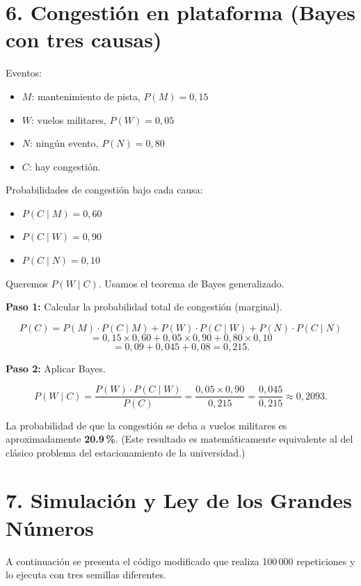 \documentclass[11pt,letterpaper]{article}
\begin{document}
\section*{6. Congestión en plataforma (Bayes con tres causas)}

Eventos:
\begin{itemize}
    \item $M$: mantenimiento de pista, $P(M) = 0{,}15$
    \item $W$: vuelos militares, $P(W) = 0{,}05$
    \item $N$: ningún evento, $P(N) = 0{,}80$
    \item $C$: hay congestión.
\end{itemize}

Probabilidades de congestión bajo cada causa:
\begin{itemize}
    \item $P(C \mid M) = 0{,}60$
    \item $P(C \mid W) = 0{,}90$
    \item $P(C \mid N) = 0{,}10$
\end{itemize}

Queremos $P(W \mid C)$. Usamos el teorema de Bayes generalizado.

\textbf{Paso 1:} Calcular la probabilidad total de congestión (marginal).

\[
P(C) = P(M) \cdot P(C \mid M) + P(W) \cdot P(C \mid W) + P(N) \cdot P(C \mid N)
\]
\[
= 0{,}15 \times 0{,}60 + 0{,}05 \times 0{,}90 + 0{,}80 \times 0{,}10
\]
\[
= 0{,}09 + 0{,}045 + 0{,}08 = 0{,}215.
\]

\textbf{Paso 2:} Aplicar Bayes.

\[
P(W \mid C) = \frac{P(W) \cdot P(C \mid W)}{P(C)} = \frac{0{,}05 \times 0{,}90}{0{,}215} = \frac{0{,}045}{0{,}215} \approx 0{,}2093.
\]

La probabilidad de que la congestión se deba a vuelos militares es aproximadamente \textbf{20.9\,\%}. (Este resultado es matemáticamente equivalente al del clásico problema del estacionamiento de la universidad.)

\section*{7. Simulación y Ley de los Grandes Números}

A continuación se presenta el código modificado que realiza 100\,000 repeticiones y lo ejecuta con tres semillas diferentes.
\end{document}
